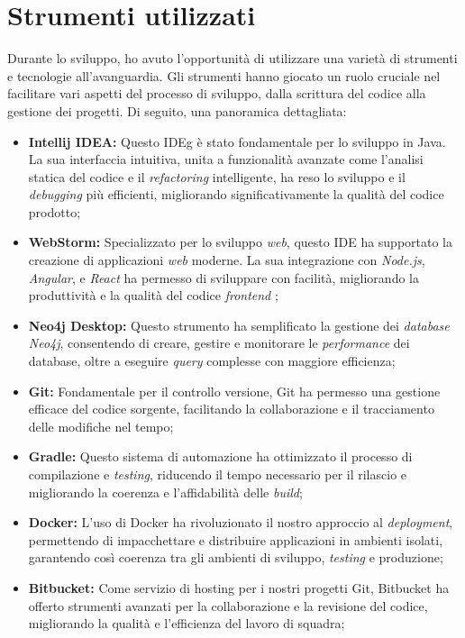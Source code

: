 \section{Strumenti utilizzati}
Durante lo sviluppo, ho avuto l'opportunità di utilizzare una varietà di strumenti e tecnologie all'avanguardia. 
Gli strumenti hanno giocato un ruolo cruciale nel facilitare vari aspetti del processo di sviluppo, dalla scrittura del codice alla gestione dei progetti. Di seguito, una panoramica dettagliata:

\begin{itemize}
\item \textbf{Intellij IDEA:} Questo \gls{IDEg} è stato fondamentale per lo sviluppo in Java. La sua interfaccia intuitiva, unita a funzionalità avanzate 
come l'analisi statica del codice e il \textit{refactoring} intelligente, ha reso lo sviluppo e il \textit{debugging} più efficienti, migliorando significativamente la qualità del codice prodotto;

\item \textbf{WebStorm:} Specializzato per lo sviluppo \textit{web}, questo IDE ha supportato la creazione di applicazioni \textit{web} moderne. La sua integrazione con \textit{Node.js}, \textit{Angular}, e 
\textit{React} ha permesso di sviluppare con facilità, migliorando la produttività e la qualità del codice \textit{frontend}  ;
\item \textbf{Neo4j Desktop:} Questo strumento ha semplificato la gestione dei \textit{database} \textit{Neo4j}, consentendo di creare, gestire e monitorare le \textit{performance} dei database, oltre a eseguire \textit{query} complesse con maggiore efficienza;
\item \textbf{Git:} Fondamentale per il controllo versione, Git ha permesso una gestione efficace del codice sorgente, facilitando la collaborazione e il tracciamento delle modifiche nel tempo;
\item \textbf{Gradle:} Questo sistema di automazione ha ottimizzato il processo di compilazione e \textit{testing}, riducendo il tempo necessario per il rilascio e migliorando la coerenza e l'affidabilità delle \textit{build};
\item \textbf{Docker:} L'uso di Docker ha rivoluzionato il nostro approccio al \textit{deployment}, permettendo di impacchettare e distribuire applicazioni in ambienti isolati, garantendo così coerenza tra gli ambienti di sviluppo, \textit{testing}  e produzione;

\item \textbf{Bitbucket:} Come servizio di hosting per i nostri progetti Git, Bitbucket ha offerto strumenti avanzati per la collaborazione e la revisione del codice, migliorando la qualità e l'efficienza del lavoro di squadra;


\end{itemize}
